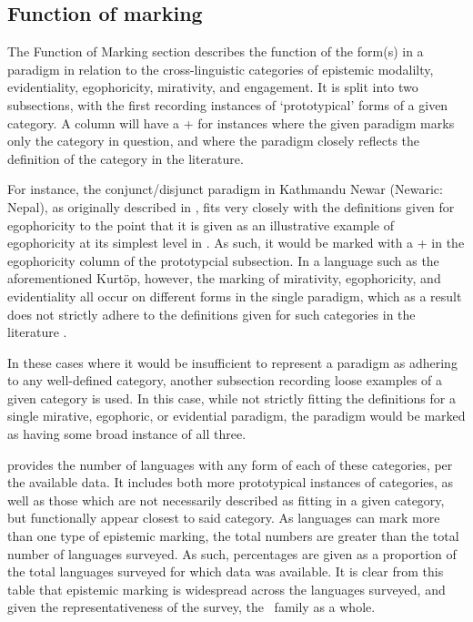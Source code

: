 \subsection{Function of marking}\label{ss:Methods:Functions}
The Function of Marking section describes the function of the form(s) in a paradigm in relation to the cross-linguistic categories of epistemic modalilty, evidentiality, egophoricity, mirativity, and engagement. It is split into two subsections, with the first recording instances of `prototypical' forms of a given category. A column will have a + for instances where the given paradigm marks only the category in question, and where the paradigm closely reflects the definition of the category in the literature.

For instance, the conjunct/disjunct paradigm in Kathmandu Newar (Newaric: Nepal), as originally described in , fits very closely with the definitions given for egophoricity to the point that it is given as an illustrative example of egophoricity at its simplest level in . As such, it would be marked with a + in the egophoricity column of the prototypcial subsection. In a language such as the aforementioned Kurtöp, however, the marking of mirativity, egophoricity, and evidentiality all occur on different forms in the single paradigm, which as a result does not strictly adhere to the definitions given for such categories in the literature \cites{DeLancey2012}{EgoIntro}{Aikhenvald2018Intro}.

In these cases where it would be insufficient to represent a paradigm as adhering to any well-defined category, another subsection recording loose examples of a given category is used. In this case, while not strictly fitting the definitions for a single mirative, egophoric, or evidential paradigm, the paradigm would be marked as having some broad instance of all three.

 provides the number of languages with any form of each of these categories, per the available data. It includes both more prototypical instances of categories, as well as those which are not necessarily described as fitting in a given category, but functionally appear closest to said category. As languages can mark more than one type of epistemic marking, the total numbers are greater than the total number of languages surveyed. As such, percentages are given as a proportion of the total languages surveyed for which data was available. It is clear from this table that epistemic marking is widespread across the languages surveyed, and given the representativeness of the survey, the \lfam\ family as a whole.

